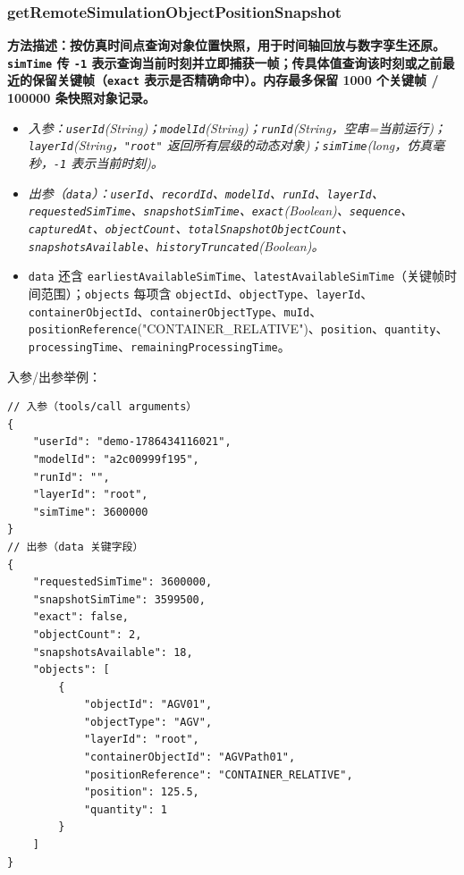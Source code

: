 \subsubsection{getRemoteSimulationObjectPositionSnapshot}
\bf{方法描述}：按仿真时间点查询对象位置快照，用于时间轴回放与数字孪生还原。\texttt{simTime} 传 \texttt{-1} 表示查询当前时刻并立即捕获一帧；传具体值查询该时刻或之前最近的保留关键帧（\texttt{exact} 表示是否精确命中）。内存最多保留 1000 个关键帧 / 100000 条快照对象记录。
\begin{itemize}
	\item \it{入参}：\texttt{userId}(String)；\texttt{modelId}(String)；\texttt{runId}(String，空串=当前运行)；\texttt{layerId}(String，\texttt{"root"} 返回所有层级的动态对象)；\texttt{simTime}(long，仿真毫秒，\texttt{-1} 表示当前时刻)。
	\item \it{出参}（\texttt{data}）：\texttt{userId}、\texttt{recordId}、\texttt{modelId}、\texttt{runId}、\texttt{layerId}、\texttt{requestedSimTime}、\texttt{snapshotSimTime}、\texttt{exact}(Boolean)、\texttt{sequence}、\texttt{capturedAt}、\texttt{objectCount}、\texttt{totalSnapshotObjectCount}、\texttt{snapshotsAvailable}、\texttt{historyTruncated}(Boolean)。
	\item \texttt{data} 还含 \texttt{earliestAvailableSimTime}、\texttt{latestAvailableSimTime}（关键帧时间范围）；\texttt{objects} 每项含 \texttt{objectId}、\texttt{objectType}、\texttt{layerId}、\texttt{containerObjectId}、\texttt{containerObjectType}、\texttt{muId}、\texttt{positionReference}("CONTAINER\_RELATIVE")、\texttt{position}、\texttt{quantity}、\texttt{processingTime}、\texttt{remainingProcessingTime}。
\end{itemize}
入参/出参举例：
\begin{lstlisting}
// 入参（tools/call arguments）
{
    "userId": "demo-1786434116021",
    "modelId": "a2c00999f195",
    "runId": "",
    "layerId": "root",
    "simTime": 3600000
}
// 出参（data 关键字段）
{
    "requestedSimTime": 3600000,
    "snapshotSimTime": 3599500,
    "exact": false,
    "objectCount": 2,
    "snapshotsAvailable": 18,
    "objects": [
        {
            "objectId": "AGV01",
            "objectType": "AGV",
            "layerId": "root",
            "containerObjectId": "AGVPath01",
            "positionReference": "CONTAINER_RELATIVE",
            "position": 125.5,
            "quantity": 1
        }
    ]
}
\end{lstlisting}\vspace{-30pt}

